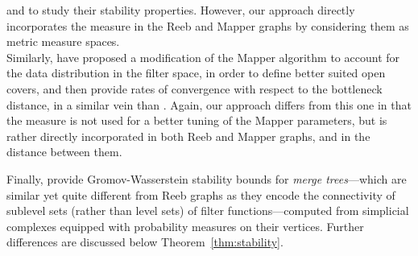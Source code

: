 \documentclass[pdflatex,sn-mathphys-ay]{sn-jnl}%
\newcommand{\spa}{X}
\newcommand{\mes}{\mathrm{m}}
\newcommand{\R}{\mathbb{R}}
\newcommand{\change}[1]{\noindent #1}
\theoremstyle{thmstyleone}%
\begin{document}
and to study their stability properties. However, our approach directly incorporates the measure in the Reeb and Mapper graphs by considering them as metric measure spaces.\\ Similarly, \citet{ruscitti2024improving} have proposed a modification of the Mapper algorithm to account for the data distribution in the filter space, in order to define better suited open covers, and then provide rates of convergence with respect to the bottleneck distance, in a similar vein than \citet{carriere2018statistical}. Again, our approach differs from this one in that the measure is not used for a better tuning of the Mapper parameters, but is rather directly incorporated in both Reeb and Mapper graphs, and in the distance between them.

%
%
Finally, \citet{liFlexibleProbabilisticTopology2025} provide Gromov-Wasserstein stability bounds for \textit{merge trees}---which are similar yet quite different from Reeb graphs as they encode the connectivity of sublevel sets (rather than level sets) of filter functions---computed from simplicial complexes equipped with probability measures on their vertices. Further differences are discussed below Theorem~\ref{thm:stability}.


\end{document}
